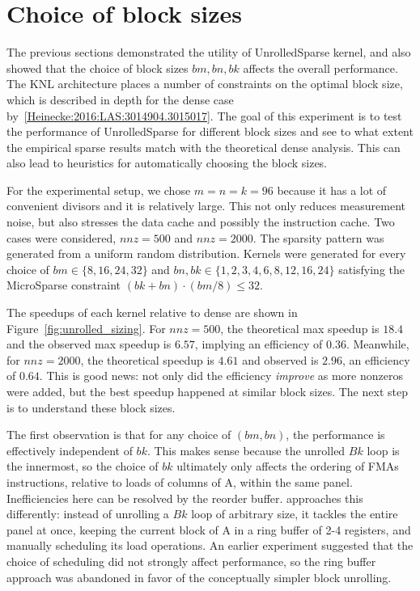 \section{Choice of block sizes}
\label{section:exp_unrolled_sizing}

The previous sections demonstrated the utility of UnrolledSparse kernel, and also showed that the choice of block sizes $bm,bn,bk$ affects the overall performance. The KNL architecture places a number of constraints on the optimal block size, which is described in depth for the dense case by~\ref{Heinecke:2016:LAS:3014904.3015017}. The goal of this experiment is to test the performance of UnrolledSparse for different block sizes and see to what extent the empirical sparse results match with the theoretical dense analysis. This can also lead to heuristics for automatically choosing the block sizes.

For the experimental setup, we chose $m=n=k=96$ because it has a lot of convenient divisors and it is relatively large. This not only reduces measurement noise, but also stresses the data cache and possibly the instruction cache. Two cases were considered, $nnz=500$ and $nnz=2000$. The sparsity pattern was generated from a uniform random distribution. Kernels were generated for every choice of $bm \in \{8,16,24,32\}$ and $bn, bk \in \{1,2,3,4,6,8,12,16,24\}$ satisfying the MicroSparse constraint $(bk+bn) \cdot (bm/8) \leq 32$. 

The speedups of each kernel relative to dense are shown in Figure~\ref{fig:unrolled_sizing}. For $nnz=500$, the theoretical max speedup is $18.4$ and the observed max speedup is $6.57$, implying an efficiency of $0.36$. Meanwhile, for $nnz=2000$, the theoretical speedup is $4.61$ and observed is $2.96$, an efficiency of $0.64$. This is good news: not only did the efficiency \emph{improve} as more nonzeros were added, but the best speedup happened at similar block sizes. The next step is to understand these block sizes.

The first observation is that for any choice of $(bm, bn)$, the performance is effectively independent of $bk$. This makes sense because the unrolled $Bk$ loop is the innermost, so the choice of $bk$ ultimately only affects the ordering of \glspl{FMA} instructions, relative to loads of columns of A, within the same panel. Inefficiencies here can be resolved by the reorder buffer.  approaches this differently: instead of unrolling a $Bk$ loop of arbitrary size, it tackles the entire panel at once, keeping the current block of A in a ring buffer of 2-4 registers, and manually scheduling its load operations. An earlier experiment suggested that the choice of scheduling did not strongly affect performance, so the ring buffer approach was abandoned in favor of the conceptually simpler block unrolling.


